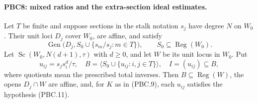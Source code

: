 \paragraph{PBC8: mixed ratios and the extra-section ideal estimates.}
\label{claim:PBC8}
Let $T$ be finite and suppose sections in the stalk notation
$s_j$ have degree $N$ on $W_0$.  Their unit loci $D_j$ cover
$W_0$, are affine, and satisfy
\[
 \operatorname{Gen}\bigl(D_j,S_0\cup\{s_m/s_j:m\in T\}\bigr),
 \qquad S_0\subseteq\operatorname{Reg}(W_0).
                                                        \tag{PBC.14}
\]
Let $\operatorname{Sc}(W_0,N(d+1),\tau)$ with $d\ge0$, and
let $W$ be its unit locus in $W_0$.  Put
\[
 u_{ij}=s_j s_i^d/\tau,\quad
 B=\langle S_0\cup\{u_{ij}:i,j\in T\}\rangle,\quad
 I=(u_{ij})\subseteq B,
                                                        \tag{PBC.15}
\]
where quotients mean the prescribed total inverses.
Then $B\subseteq\operatorname{Reg}(W)$, the opens
$D_j\cap W$ are affine, and, for $K$ as in (PBC.9),
each $u_{ij}$ satisfies the hypothesis (PBC.11).

